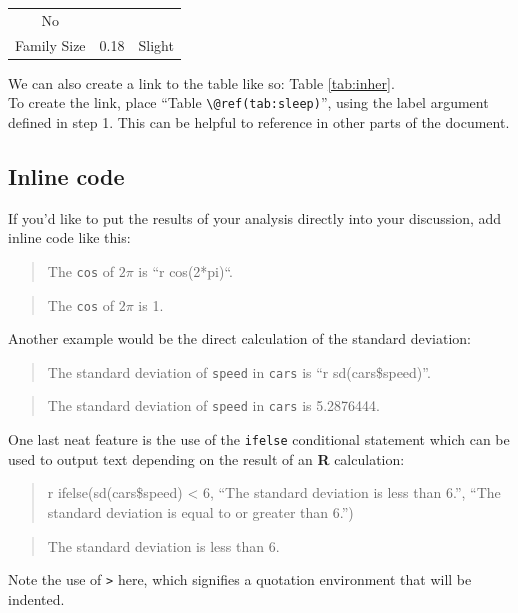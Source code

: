 \documentclass[12pt,oneside]{chicagocapstone}
\begin{document}
\begin{longtable}[]{@{}ccc@{}}
\begin{minipage}[t]{0.16\columnwidth}
No\strut
\end{minipage}\tabularnewline
\begin{minipage}[t]{0.29\columnwidth}\centering\strut
Family Size\strut
\end{minipage} & \begin{minipage}[t]{0.47\columnwidth}\centering\strut
0.18\strut
\end{minipage} & \begin{minipage}[t]{0.16\columnwidth}\centering\strut
Slight\strut
\end{minipage}\tabularnewline
\bottomrule
\end{longtable}
We can also create a link to the table like so: Table \ref{tab:inher}.\\
To create the link, place ``Table
\texttt{\textbackslash{}@ref(tab:sleep)}'', using the label argument
defined in step 1. This can be helpful to reference in other parts of
the document.

\subsection*{Inline code}\label{inline-code}

If you'd like to put the results of your analysis directly into your
discussion, add inline code like this:
\begin{quote}
The \texttt{cos} of \(2 \pi\) is ``r cos(2*pi)``.
\end{quote}
\begin{quote}
The \texttt{cos} of \(2 \pi\) is 1.
\end{quote}
Another example would be the direct calculation of the standard
deviation:
\begin{quote}
The standard deviation of \texttt{speed} in \texttt{cars} is ``r
sd(cars\$speed)''.
\end{quote}
\begin{quote}
The standard deviation of \texttt{speed} in \texttt{cars} is 5.2876444.
\end{quote}
One last neat feature is the use of the \texttt{ifelse} conditional
statement which can be used to output text depending on the result of an
\textbf{R} calculation:
\begin{quote}
r ifelse(sd(cars\$speed) \textless{} 6, ``The standard deviation is less
than 6.'', ``The standard deviation is equal to or greater than 6.'')
\end{quote}
\begin{quote}
The standard deviation is less than 6.
\end{quote}
Note the use of \texttt{\textgreater{}} here, which signifies a
quotation environment that will be indented.
\end{document}
